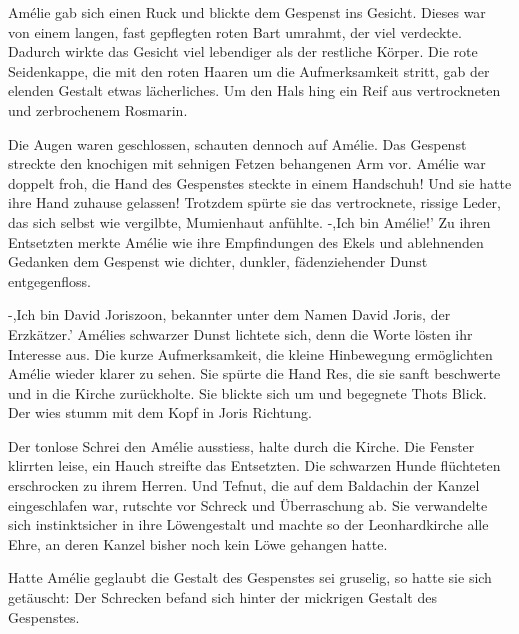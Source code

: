 \documentclass[11pt,titlepage,a5paper]{book}
\begin{document}
Amélie gab sich einen Ruck und blickte dem Gespenst ins Gesicht. Dieses war von einem langen, fast gepflegten roten Bart umrahmt, der viel verdeckte. Dadurch wirkte das Gesicht viel lebendiger als der restliche Körper. Die rote Seidenkappe, die mit den roten Haaren um die Aufmerksamkeit stritt, gab der elenden Gestalt etwas lächerliches. Um den Hals hing ein Reif aus vertrockneten und zerbrochenem Rosmarin. 

Die Augen waren geschlossen, schauten dennoch auf Amélie. Das Gespenst streckte den knochigen mit sehnigen Fetzen behangenen Arm vor. Amélie war doppelt froh, die Hand des Gespenstes steckte in einem Handschuh! Und sie hatte ihre Hand zuhause gelassen! Trotzdem spürte sie das vertrocknete, rissige Leder, das sich selbst wie vergilbte, Mumienhaut anfühlte. -,Ich bin Amélie!' Zu ihren Entsetzten merkte Amélie wie ihre Empfindungen des Ekels und ablehnenden Gedanken dem Gespenst wie dichter, dunkler, fädenziehender Dunst entgegenfloss. 

-,Ich bin David Joriszoon, bekannter unter dem Namen David Joris, der Erzkätzer.' Amélies schwarzer Dunst lichtete sich, denn die Worte lösten ihr Interesse aus. Die kurze Aufmerksamkeit, die kleine Hinbewegung ermöglichten Amélie wieder klarer zu sehen. Sie spürte die Hand Res, die sie sanft beschwerte und in die Kirche zurückholte. Sie blickte sich um und begegnete Thots Blick. Der wies stumm mit dem Kopf in Joris Richtung.

Der tonlose Schrei den Amélie ausstiess, halte durch die Kirche. Die Fenster klirrten leise, ein Hauch streifte das Entsetzten. Die schwarzen Hunde flüchteten erschrocken zu ihrem Herren. Und Tefnut, die auf dem Baldachin der Kanzel eingeschlafen war, rutschte vor Schreck und Überraschung ab. Sie verwandelte sich instinktsicher in ihre Löwengestalt und machte so der Leonhardkirche alle Ehre, an deren Kanzel bisher noch kein Löwe gehangen hatte. 

Hatte Amélie geglaubt die Gestalt des Gespenstes sei gruselig, so hatte sie sich getäuscht: Der Schrecken befand sich hinter der mickrigen Gestalt des Gespenstes. 
\end{document}
